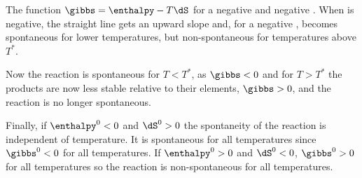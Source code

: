 \documentclass[../mit-general-chemistry.tex]{subfiles}
\begin{document}
\begin{hfigure}
  \begin{center}
  \end{center}
  
  \caption{The function $\gibbs = \enthalpy - T \dS$ for a negative
    \dS and negative \enthalpy. When \dS is negative, the straight
    line gets an upward slope and, for a negative \enthalpy, becomes
    spontaneous for lower temperatures, but non-spontaneous for
    temperatures above $T^*$.}
\end{hfigure}

Now the reaction is spontaneous for $T < T^*$, as $\gibbs < 0$ and for
$T > T^*$ the products are now less stable relative to their elements,
$\gibbs > 0$, and the reaction is no longer spontaneous.

Finally, if $\enthalpy^0 < 0$ and $\dS^0 > 0$ the spontaneity of the
reaction is independent of temperature. It is spontaneous for all
temperatures since $\gibbs^0 < 0$ for all temperatures. If
$\enthalpy^0 > 0$ and $\dS^0 < 0$, $\gibbs^0 > 0$ for all temperatures
so the reaction is non-spontaneous for all temperatures.
\end{document}
